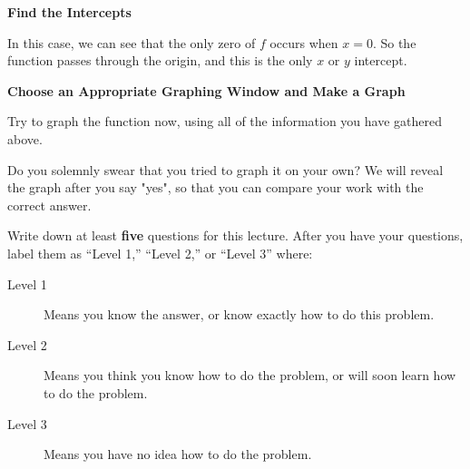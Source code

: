 \documentclass{ximera}
\begin{document}
\begin{question}
  \textbf{Find the Intercepts}
  
  In this case, we can see that the only zero of $f$ occurs when $x=0$.  So the function passes through the origin, and this is the only $x$ or $y$ intercept.
  
  \textbf{Choose an Appropriate Graphing Window and Make a Graph}
  
  Try to graph the function now, using all of the information you have gathered above.  
  
  
  \begin{solution}
  
  Do you solemnly swear that you tried to graph it on your own?  We will reveal the graph after you say "yes", so that you can compare your work with the correct answer.
  
  	\begin{multipleChoice}
    \end{multipleChoice}
    
     
\begin{image}
\end{image}

  \end{solution}


  
\end{question}

Write down at least \textbf{five} questions for this lecture. After
you have your questions, label them as ``Level 1,'' ``Level 2,'' or ``Level 3'' where:
\begin{description}
\item[Level 1] Means you know the answer, or know exactly how to do this problem.
\item[Level 2] Means you think you know how to do the problem, or will soon learn how to do the problem.
\item[Level 3] Means you have no idea how to do the problem. 
\end{description}
\begin{question}
  \begin{freeResponse}
  \end{freeResponse}
\end{question}
\end{document}
